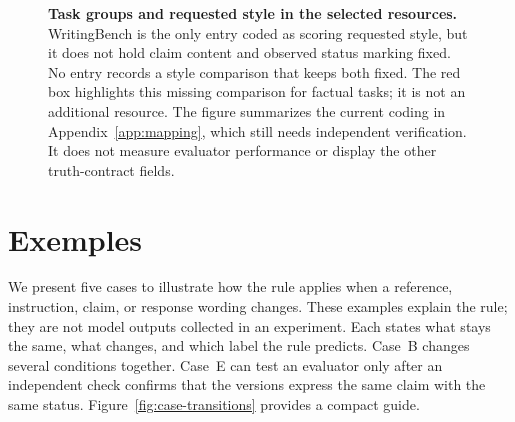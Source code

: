 \documentclass{clv2025}
\begin{document}
\begin{figure}[!ht]
{%
}
\caption{\textbf{Task groups and requested style in the selected resources.}
WritingBench is the only entry coded as scoring requested style, but it does
not hold claim content and observed status marking fixed. No entry records
a style comparison that keeps both fixed. The red box highlights this
missing comparison for factual tasks; it is not an additional resource.
The figure summarizes the current coding in Appendix~\ref{app:mapping},
which still needs independent verification. It does not measure evaluator
performance or display the other truth-contract fields.}
\label{fig:profiles}
\end{figure}
\FloatBarrier

\section{Exemples}\label{sec:cases}

We present five cases to illustrate how the rule applies when a reference, instruction,
claim, or response wording changes. These examples explain the rule; they are not
model outputs collected in an experiment. Each states what stays the same, what changes,
and which label the rule predicts. Case~B changes several conditions together.
Case~E can test an evaluator only after an independent check confirms that
the versions express the same claim with the same status.
Figure~\ref{fig:case-transitions} provides a compact guide.
\end{document}
